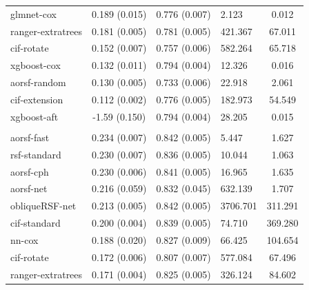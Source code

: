 \documentclass[twoside,11pt]{article}\usepackage[]{graphicx}\usepackage[]{xcolor}
\newenvironment{knitrout}{}{} %
\begin{document}
\begin{knitrout}
\begin{longtable}[t]{lcclc}
\hspace{1em}glmnet-cox & 0.189 (0.015) & 0.776 (0.007) & 2.123 & 0.012\\
\hspace{1em}ranger-extratrees & 0.181 (0.005) & 0.781 (0.005) & 421.367 & 67.011\\
\hspace{1em}cif-rotate & 0.152 (0.007) & 0.757 (0.006) & 582.264 & 65.718\\
\hspace{1em}xgboost-cox & 0.132 (0.011) & 0.794 (0.004) & 12.326 & 0.016\\
\hspace{1em}aorsf-random & 0.130 (0.005) & 0.733 (0.006) & 22.918 & 2.061\\
\hspace{1em}cif-extension & 0.112 (0.002) & 0.776 (0.005) & 182.973 & 54.549\\
\hspace{1em}xgboost-aft & -1.59 (0.150) & 0.794 (0.004) & 28.205 & 0.015\\
\addlinespace[0.3em]
\hline
\multicolumn{5}{l}{\textit{\textbf{ARIC; heart failure, n = 13623, p = 41}}}\\
\hline
\hspace{1em}aorsf-fast & 0.234 (0.007) & 0.842 (0.005) & 5.447 & 1.627\\
\hspace{1em}rsf-standard & 0.230 (0.007) & 0.836 (0.005) & 10.044 & 1.063\\
\hspace{1em}aorsf-cph & 0.230 (0.006) & 0.841 (0.005) & 16.965 & 1.635\\
\hspace{1em}aorsf-net & 0.216 (0.059) & 0.832 (0.045) & 632.139 & 1.707\\
\hspace{1em}obliqueRSF-net & 0.213 (0.005) & 0.842 (0.005) & 3706.701 & 311.291\\
\hspace{1em}cif-standard & 0.200 (0.004) & 0.839 (0.005) & 74.710 & 369.280\\
\hspace{1em}nn-cox & 0.188 (0.020) & 0.827 (0.009) & 66.425 & 104.654\\
\hspace{1em}cif-rotate & 0.172 (0.006) & 0.807 (0.007) & 577.084 & 67.496\\
\hspace{1em}ranger-extratrees & 0.171 (0.004) & 0.825 (0.005) & 326.124 & 84.602\\

\end{longtable}
\end{knitrout}
\end{document}
